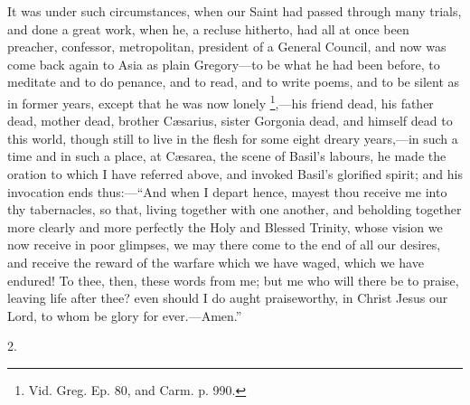 It was under such circumstances, when our Saint had passed through
many trials, and done a great work, when he, a recluse hitherto, had
all at once been preacher, confessor, metropolitan, president of a
General Council, and now was come back again to Asia as plain Gregory—to
be what he had been before, to meditate and to do penance, and to
read, and to write poems, and to be silent as in former years, except
that he was now lonely \footnote{Vid. Greg. Ep. 80, and Carm. p. 990.},—his
friend dead, his father dead, mother dead, brother Cæsarius, sister
Gorgonia dead, and himself dead to this world, though still to live in
the flesh for some eight dreary years,—in such a time and in such a
place, at Cæsarea, the scene of Basil's labours, he made the oration
to which I have referred above, and invoked Basil's glorified spirit;
and his invocation ends thus:—``And when I depart hence, mayest
thou receive me into thy tabernacles, so that, living together with
one another, and beholding together more clearly and more perfectly
the Holy and Blessed Trinity, whose vision we now receive in poor
glimpses, we may there come to the end of all our desires, and receive
the reward of the warfare which we have waged, which we have endured!
To thee, then, these words from me; but me who will there be to
praise, leaving life after thee? even should I do aught praiseworthy,
in Christ Jesus our Lord, to whom be glory for ever.—Amen.''

2.

